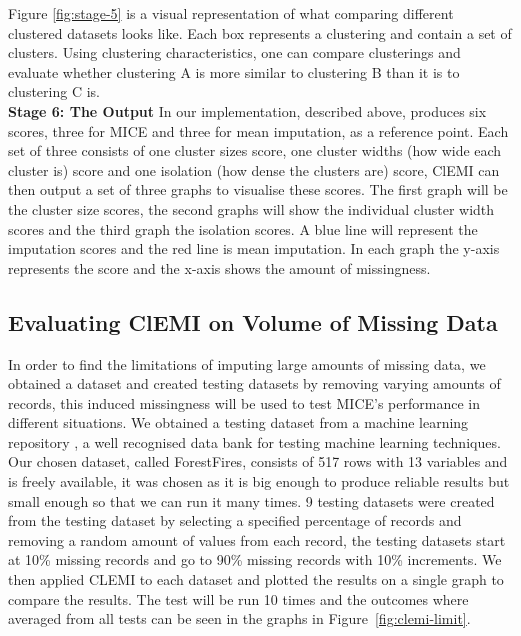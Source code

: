 \documentclass[conference,compsoc]{IEEEtran}
\begin{document}
	Figure \ref{fig:stage-5} is a visual representation of what comparing different clustered datasets looks like. Each box represents a clustering and contain a set of clusters. Using clustering characteristics, one can compare clusterings and evaluate whether clustering A is more similar to clustering B than it is to clustering C is.
	\\
	\indent \textbf{Stage 6: The Output}
	In our implementation, described above, produces six scores, three for MICE and three for mean imputation, as a reference point. Each set of three consists of one cluster sizes score, one cluster widths (how wide each cluster is) score and one isolation (how dense the clusters are) score, ClEMI can then output a set of three graphs to visualise these scores. The first graph will be the cluster size scores, the second graphs will show the individual cluster width scores and the third graph the isolation scores. A blue line will represent the imputation scores and the red line is mean imputation. In each graph the y-axis represents the score and the x-axis shows the amount of missingness. 

	\subsection{Evaluating ClEMI on Volume of Missing Data} %
	\label{sub:evaluating_clemi_on_volume_of_missing_data}
	In order to find the limitations of imputing large amounts of missing data, we obtained a dataset and created testing datasets by removing varying amounts of records, this induced missingness will be used to test MICE's performance in different situations. We obtained a testing dataset from a machine learning repository \cite{forestFires}, a well recognised data bank for testing machine learning techniques. Our chosen dataset, called ForestFires, consists of 517 rows with 13 variables and is freely available,  it was chosen as it is big enough to produce reliable results but small enough so that we can run it many times. 9 testing datasets were created from the testing dataset by selecting a specified percentage of records and removing a random amount of values from each record, the testing datasets start at 10\% missing records and go to 90\% missing records with 10\% increments. We then applied CLEMI to each dataset and plotted the results on a single graph to compare the results. The test will be run 10 times and the outcomes where averaged from all tests can be seen in the graphs in Figure~\ref{fig:clemi-limit}.  
\end{document}
